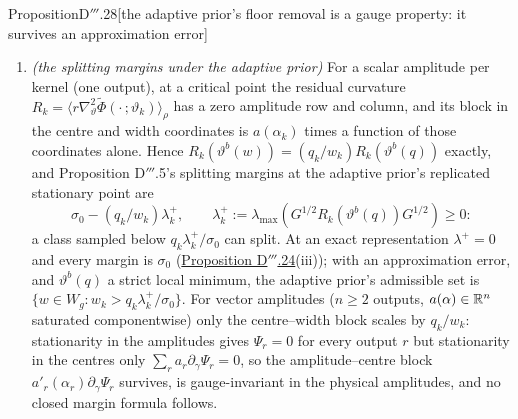 \begin{thm}{Proposition}{D$'''$.28}[the adaptive prior's floor removal is a gauge property: it survives an
approximation error]
\begin{enumerate}[label=\textup{(\roman*)}]
    \[
      F = \sigma_0\hat J(\tilde A + \sigma_0I)^{-1}\tilde g,\qquad\tilde A := H_L - \tilde R,
    \]
    $\tilde A$ the whitened weighted Hessian of $L_q$ at $\vartheta^b(q)$ ($\tilde R$ the whitened weighted residual
    curvature) and $\tilde g$ the whitened gauge displacement, the direct effect of the weights on $\fhat$ being
    $\hat J\tilde g$: \hyperref[res:thmDppp:24]{Proposition D$'''$.24}(i) with the full Hessian in place of the
    Gauss--Newton block. Along the same derivation the adaptive prior's sensitivity is $F(\sigma)$ at $\sigma = 0$,
    which vanishes, as (i) says.
  \item \emph{(the splitting margins under the adaptive prior)} For a scalar amplitude per kernel (one output), at a
    critical point the residual curvature
    $R_k = \langle r\nabla^2_\vartheta\tilde\Phi(\cdot\,;\vartheta_k)\rangle_\rho$ has a zero amplitude row and
    column, and its block in the centre and width coordinates is $a(\alpha_k)$ times a function of those coordinates
    alone. Hence $R_k(\vartheta^b(w)) = (q_k/w_k)R_k(\vartheta^b(q))$ exactly, and Proposition D$'''$.5's splitting
    margins at the adaptive prior's replicated stationary point are
    \[
      \sigma_0 - (q_k/w_k)\lambda^+_k,\qquad
      \lambda^+_k := \lambda_{\max}(G^{1/2}R_k(\vartheta^b(q))G^{1/2})\ge0:
    \]
    a class sampled below $q_k\lambda^+_k/\sigma_0$ can split. At an exact representation $\lambda^+ = 0$ and every
    margin is $\sigma_0$ (\hyperref[res:thmDppp:24]{Proposition D$'''$.24}(iii)); with an approximation error, and
    $\vartheta^b(q)$ a strict local minimum, the adaptive prior's admissible set is
    $\{w\in W_g : w_k > q_k\lambda^+_k/\sigma_0\}$. For vector amplitudes ($n\ge2$ outputs, $a(\alpha)\in\mathbb{R}^n$
    saturated componentwise) only the centre--width block scales by $q_k/w_k$: stationarity in the amplitudes gives
    $\Psi_r = 0$ for every output $r$ but stationarity in the centres only $\sum_ra_r\partial_\gamma\Psi_r = 0$, so
    the amplitude--centre block $a'_r(\alpha_r)\partial_\gamma\Psi_r$ survives, is gauge-invariant in the physical
    amplitudes, and no closed margin formula follows.
\end{enumerate}
\end{thm}

